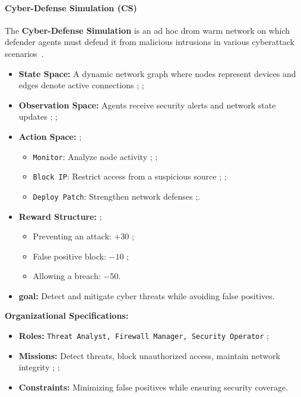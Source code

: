 \documentclass[pdflatex,sn-mathphys-num]{sn-jnl}%
\theoremstyle{thmstyleone}%
\theoremstyle{thmstyletwo}%
\theoremstyle{thmstylethree}%
\begin{document}
\paragraph{Cyber-Defense Simulation (CS)}
The \textbf{Cyber-Defense Simulation} is an ad hoc drom warm network on which defender agents must defend it from malicious intrusions in various cyberattack scenarios~\cite{Maxwell2021}. 

\begin{itemize}
    \item \textbf{State Space:} A dynamic network graph where nodes represent devices and edges denote active connections ; ;
    \item \textbf{Observation Space:} Agents receive security alerts and network state updates ; ;
    \item \textbf{Action Space:}  ;
    \begin{itemize}
        \item \texttt{Monitor}: Analyze node activity ; ;
        \item \texttt{Block IP}: Restrict access from a suspicious source ; ;
        \item \texttt{Deploy Patch}: Strengthen network defenses ;.
    \end{itemize}
    \item \textbf{Reward Structure:} ;
    \begin{itemize}
        \item Preventing an attack: $+30$ ;
        \item False positive block: $-10$ ;
        \item Allowing a breach: $-50$.
    \end{itemize}
    \item \textbf{goal:} Detect and mitigate cyber threats while avoiding false positives.
\end{itemize}

\textbf{Organizational Specifications:} 
\begin{itemize}
    \item \textbf{Roles:} \texttt{Threat Analyst, Firewall Manager, Security Operator} ;
    \item \textbf{Missions:} Detect threats, block unauthorized access, maintain network integrity ; ;
    \item \textbf{Constraints:} Minimizing false positives while ensuring security coverage.
\end{itemize}

\bigskip
\end{document}
